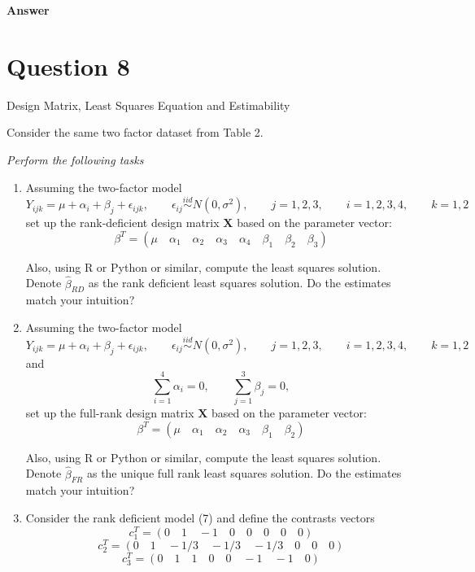 \documentclass[letterpaper]{article}
\begin{document}
	\textbf{Answer}
	
	\clearpage
	
	\section{Question 8}
	{\color{deepred}  Design Matrix, Least Squares Equation and Estimability}
	
	Consider the same two factor dataset from Table 2.
	
	\emph{Perform the following tasks}
	\begin{enumerate}
		\item[(i)] Assuming the two-factor model
		\begin{equation}
			Y_{ijk}=\mu+\alpha_i+\beta_j+\epsilon_{ijk},
			\qquad
			\epsilon_{ij}\overset{iid}{\sim}N(0,\sigma^2),
			\qquad
			j=1,2,3,
			\qquad
			i=1,2,3,4,
			\qquad
			k=1,2
		\end{equation}
		set up the rank-deficient design matrix $\mathbf{X}$ based on the parameter vector:
		\[
		\beta^T=(\mu \quad \alpha_1 \quad \alpha_2 \quad \alpha_3 \quad \alpha_4 \quad \beta_1 \quad \beta_2 \quad \beta_3)
		\]
		
		Also, using R or Python or similar, compute the least squares solution. Denote $\hat{\beta}_{RD}$ as the rank deficient least squares solution. Do the estimates match your intuition?
		
		\item[(ii)] Assuming the two-factor model
		\begin{equation}
			Y_{ijk}=\mu+\alpha_i+\beta_j+\epsilon_{ijk},
			\qquad
			\epsilon_{ij}\overset{iid}{\sim}N(0,\sigma^2),
			\qquad
			j=1,2,3,
			\qquad
			i=1,2,3,4,
			\qquad
			k=1,2
		\end{equation}
		and
		\begin{equation}
			\sum_{i=1}^4 \alpha_i=0,
			\qquad
			\sum_{j=1}^3 \beta_j=0,
		\end{equation}
		set up the full-rank design matrix $\mathbf{X}$ based on the parameter vector:
		\[
		\beta^T=(\mu \quad \alpha_1 \quad \alpha_2 \quad \alpha_3 \quad \beta_1 \quad \beta_2)
		\]
		
		Also, using R or Python or similar, compute the least squares solution. Denote $\hat{\beta}_{FR}$ as the unique full rank least squares solution. Do the estimates match your intuition?
		
		\item[(iii)] Consider the rank deficient model (7) and define the contrasts vectors
		\[
		c_1^T=(0 \quad 1 \quad -1 \quad 0 \quad 0 \quad 0 \quad 0 \quad 0)
		\]
		\[
		c_2^T=(0 \quad 1 \quad -1/3 \quad -1/3 \quad -1/3 \quad 0 \quad 0 \quad 0)
		\]
		\[
		c_3^T=(0 \quad 1 \quad 1 \quad 0 \quad 0 \quad -1 \quad -1 \quad 0)
		\]
		

\end{enumerate}
\end{document}
